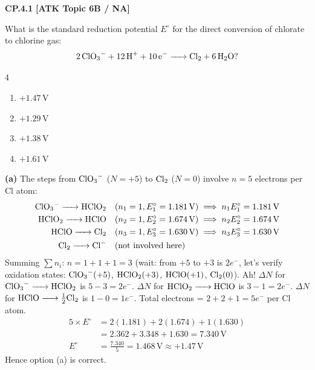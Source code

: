 \begin{problembox}
\textbf{CP.4.1} \hfill \textbf{[ATK Topic 6B / NA]}

What is the standard reduction potential $E^\circ$ for the direct conversion of chlorate to chlorine gas:
\begin{equation*}
    \ce{2ClO3^- + 12H+ + 10e^- -> Cl2 + 6H2O}?
\end{equation*}
\begin{multicols}{4}
\begin{enumerate}[label=(\alph*)]
    \item $+1.47\,\text{V}$
    \item $+1.29\,\text{V}$
    \item $+1.38\,\text{V}$
    \item $+1.61\,\text{V}$
\end{enumerate}
\end{multicols}
\end{problembox}
\begin{solution}
\textbf{(a)}
The steps from $\ce{ClO3^-}$ ($N = +5$) to $\ce{Cl2}$ ($N = 0$) involve $n = 5$ electrons per Cl atom:
\begin{align*}
    \ce{ClO3^- -> HClO2} \quad &(n_1 = 1, E_1^\circ = 1.181\,\text{V}) \implies n_1 E_1^\circ = 1.181\,\text{V} \\
    \ce{HClO2 -> HClO} \quad &(n_2 = 1, E_2^\circ = 1.674\,\text{V}) \implies n_2 E_2^\circ = 1.674\,\text{V} \\
    \ce{HClO -> Cl2} \quad &(n_3 = 1, E_3^\circ = 1.630\,\text{V}) \implies n_3 E_3^\circ = 1.630\,\text{V} \\
    \ce{Cl2 -> Cl^-} \quad &\text{(not involved here)}
\end{align*}
Summing $\sum n_i$: $n = 1 + 1 + 1 = 3$ (wait: from $+5$ to $+3$ is $2e^-$, let's verify oxidation states: $\ce{ClO3^-} (+5)$, $\ce{HClO2} (+3)$, $\ce{HClO} (+1)$, $\ce{Cl2} (0)$).
Ah! $\Delta N$ for $\ce{ClO3^- -> HClO2}$ is $5 - 3 = 2e^-$.
$\Delta N$ for $\ce{HClO2 -> HClO}$ is $3 - 1 = 2e^-$.
$\Delta N$ for $\ce{HClO -> \tfrac{1}{2}Cl2}$ is $1 - 0 = 1e^-$.
Total electrons = $2 + 2 + 1 = 5e^-$ per Cl atom.
\begin{align*}
    5 \times E^\circ &= 2(1.181) + 2(1.674) + 1(1.630) \\
    &= 2.362 + 3.348 + 1.630 = 7.340\,\text{V} \\
    E^\circ &= \frac{7.340}{5} = 1.468\,\text{V} \approx +1.47\,\text{V}
\end{align*}
Hence option (a) is correct.
\end{solution}


